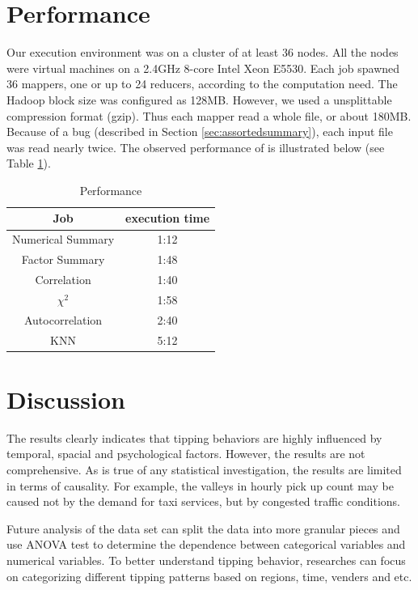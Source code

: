 \documentclass[12pt,a4paper]{article}
\begin{document}
  \section{Performance}
  Our execution environment was on a cluster of at least 36 nodes. All the nodes were virtual machines on a 2.4GHz 8-core Intel Xeon E5530. Each job spawned 36 mappers, one or up to 24 reducers, according to the computation need. The Hadoop block size was configured as 128MB. However, we used a unsplittable compression format (gzip). Thus each mapper read a whole file, or about 180MB. Because of a bug (described in Section \ref{sec:assortedsummary}), each input file was read nearly twice. 
  The observed performance of is illustrated below (see Table \ref{tab:performance}).
  \begin{table}[h]
    \center
    \caption{Performance}
    \label{tab:performance}
    \begin{tabular}{|c|c|}\hline
      Job & execution time\\  \hline
      Numerical Summary & 1:12\\  \hline
      Factor Summary & 1:48\\  \hline
      Correlation & 1:40\\  \hline
      $\chi^2$ & 1:58\\  \hline
      Autocorrelation & 2:40\\  \hline
      KNN & 5:12\\  \hline
    \end{tabular}
  \end{table}

  \section{Discussion}
  The results clearly indicates that tipping behaviors are highly influenced by temporal, spacial and psychological factors. However, the results are not comprehensive. As is true of any statistical investigation, the results are limited in terms of causality. For example, the valleys in hourly pick up count may be caused not by the demand for taxi services, but by congested traffic conditions.

  Future analysis of the data set can split the data into more granular pieces and use ANOVA test to determine the dependence between  categorical variables and numerical variables. To better understand tipping behavior, researches can focus on categorizing different tipping patterns based on regions, time, venders and etc.
\end{document}
